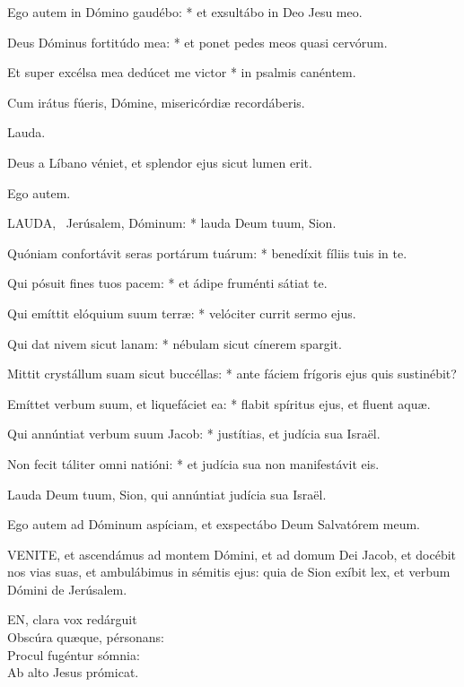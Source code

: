 Ego autem in Dómino gaudébo: * et exsultábo in Deo Jesu meo.

Deus Dóminus fortitúdo mea: * et ponet pedes meos quasi cervórum.

Et super excélsa mea dedúcet me victor * in psalmis canéntem.

 Cum irátus fúeris, Dómine, misericórdiæ recordáberis.

 Lauda. \textdagger

  Deus a Líbano véniet, et splendor ejus sicut lumen erit.

 Ego autem.


\lettrine[lines=2]{L}{AUDA}, \textdagger\ Jerúsalem, Dóminum: * lauda Deum tuum, Sion.

Quóniam confortávit seras portárum tuárum: * benedíxit fíliis tuis in te.

Qui pósuit fines tuos pacem: * et ádipe fruménti sátiat te.

Qui emíttit elóquium suum terræ: * velóciter currit sermo ejus.

Qui dat nivem sicut lanam: * nébulam sicut cínerem spargit.

Mittit crystállum suam sicut buccéllas: * ante fáciem frígoris ejus quis sustinébit?

Emíttet verbum suum, et liquefáciet ea: * flabit spíritus ejus, et fluent aquæ.

Qui annúntiat verbum suum Jacob: * justítias, et judícia sua Israël.

Non fecit táliter omni natióni: * et judícia sua non manifestávit eis.

 Lauda Deum tuum, Sion, qui annúntiat judícia sua Israël.

  Ego autem ad Dóminum aspíciam, et exspectábo Deum Salvatórem meum.



\lettrine[lines=2]{V}{ENITE}, et ascendámus ad montem Dómini, et ad domum Dei Jacob, et docébit nos vias suas, et ambulábimus in sémitis ejus: quia de Sion exíbit lex, et verbum Dómini de Jerúsalem.


\lettrine[lines=2]{E}{N}, clara vox redárguit\\
Obscúra quæque, pérsonans:\\
Procul fugéntur sómnia:\\
Ab alto Jesus prómicat.

